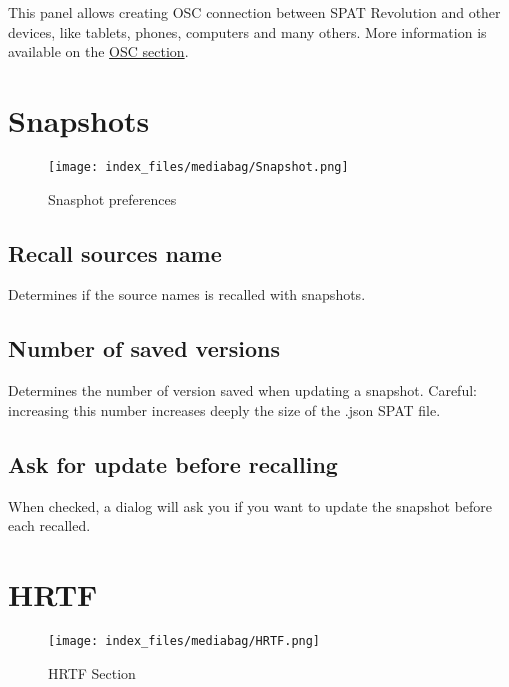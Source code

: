 \documentclass[
  letterpaper,
  DIV=11,
  numbers=noendperiod]{scrreport}
\begin{document}
This panel allows creating OSC connection between SPAT Revolution and
other devices, like tablets, phones, computers and many others. More
information is available on the
\href{Ecosystem_\&_integration_OSC_Connections_Matrix.md}{OSC section}.

\hypertarget{snapshots}{%
\section{Snapshots}\label{snapshots}}

\begin{figure}

{\centering \texttt{[image: index\_files/mediabag/Snapshot.png]}

}

\caption{Snasphot preferences}

\end{figure}

\hypertarget{recall-sources-name}{%
\subsection{Recall sources name}\label{recall-sources-name}}

Determines if the source names is recalled with snapshots.

\hypertarget{number-of-saved-versions}{%
\subsection{Number of saved versions}\label{number-of-saved-versions}}

Determines the number of version saved when updating a snapshot.
Careful: increasing this number increases deeply the size of the .json
SPAT file.

\hypertarget{ask-for-update-before-recalling}{%
\subsection{Ask for update before
recalling}\label{ask-for-update-before-recalling}}

When checked, a dialog will ask you if you want to update the snapshot
before each recalled.

\hypertarget{hrtf-1}{%
\section{HRTF}\label{hrtf-1}}

\begin{figure}

{\centering \texttt{[image: index\_files/mediabag/HRTF.png]}

}

\caption{HRTF Section}

\end{figure}
\end{document}
